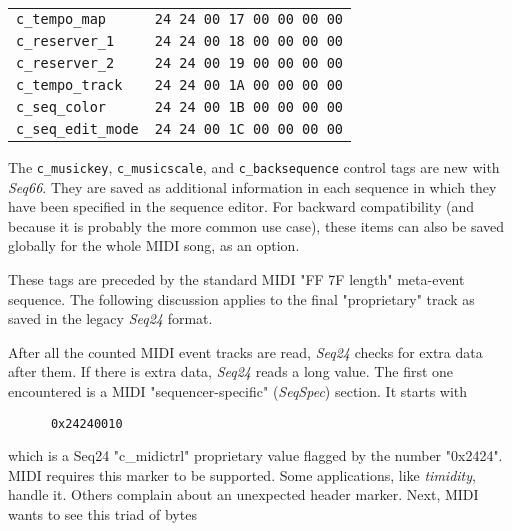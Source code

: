 \begin{table}[htb]
\begin{tabular}{l l}
         \texttt{c\_tempo\_map}     & \texttt{24 24 00 17 00 00 00 00} \\
         \texttt{c\_reserver\_1}    & \texttt{24 24 00 18 00 00 00 00} \\
         \texttt{c\_reserver\_2}    & \texttt{24 24 00 19 00 00 00 00} \\
         \texttt{c\_tempo\_track}   & \texttt{24 24 00 1A 00 00 00 00} \\
         \texttt{c\_seq\_color}     & \texttt{24 24 00 1B 00 00 00 00} \\
         \texttt{c\_seq\_edit\_mode} & \texttt{24 24 00 1C 00 00 00 00} \\
      \end{tabular}
   \end{table}

   The \texttt{c\_musickey},
   \texttt{c\_musicscale}, and
   \texttt{c\_backsequence}
   control tags are new with \textsl{Seq66}.
   They are saved as additional information in each sequence in which they
   have been specified in the sequence editor.
   For backward compatibility (and because it is probably the more
   common use case), these items can also be
   saved globally for the whole MIDI song, as an option.

   These tags
   are preceded by the standard MIDI "FF 7F length" meta-event sequence.
   The following discussion applies to the final "proprietary" track as
   saved in the legacy \textsl{Seq24} format.

   After all the counted MIDI event
   tracks are read, \textsl{Seq24} checks for
   extra data after them.
   If there is extra data, \textsl{Seq24} reads a long value.
   The first one encountered is a MIDI "sequencer-specific"
   (\textsl{SeqSpec}) section.  It starts with

   \begin{verbatim}
      0x24240010
   \end{verbatim}

   which is a Seq24 "c\_midictrl" proprietary value flagged by the
   number "0x2424".
   MIDI requires this marker to be supported.  Some applications, like
   \textsl{timidity}, handle it.  Others %
   complain about an unexpected header marker.
   Next, MIDI wants to see this triad of bytes

